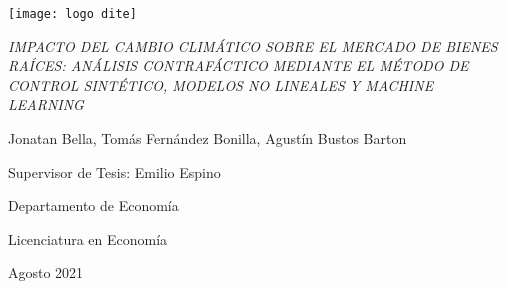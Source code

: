 \documentclass[12pt]{article}
\begin{document}

\begin{titlepage}
{\centering\texttt{[image: logo dite]}\par}
\vspace{1 cm}
\vspace{2.5cm}
{\centering\sloppy\large\textit{IMPACTO DEL CAMBIO CLIMÁTICO SOBRE EL MERCADO DE BIENES RAÍCES: ANÁLISIS CONTRAFÁCTICO MEDIANTE EL MÉTODO DE CONTROL SINTÉTICO, MODELOS NO LINEALES Y MACHINE LEARNING}  \par}

\vfill
{\centering\large Jonatan Bella, Tomás Fernández Bonilla, Agustín Bustos Barton \par}
{\centering\large Supervisor de Tesis: Emilio Espino \par}

{\centering\large Departamento de Economía \par}
{\centering\large Licenciatura en Economía \par}
{\centering\large Agosto 2021 \par}
\end{titlepage}


\newpage
\clearpage
\setcounter{page}{1}
\renewcommand*\contentsname{Índice}
\tableofcontents

\newpage

\end{document}

